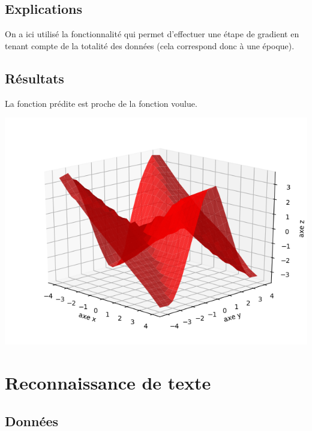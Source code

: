 \documentclass[11pt,class=report,crop=false]{standalone}
\begin{document}
\subsection{Explications}

On a ici utilisé la fonctionnalité  qui permet d'effectuer une étape de gradient en tenant compte de la totalité des données (cela correspond donc à une époque).


\subsection{Résultats}


La fonction prédite est proche de la fonction voulue.

\begin{center}
\includegraphics[scale=\myscale,scale=0.5]{figures/tf2-deuxvar-fonction-approx}
\end{center}


\section{Reconnaissance de texte}

\subsection{Données}
\end{document}
